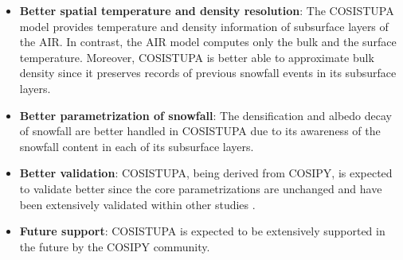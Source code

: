 \begin{itemize}

	\item \textbf{Better spatial temperature and density resolution}: The COSISTUPA model provides temperature and density
	      information of subsurface layers of the \ac{AIR}. In contrast, the \ac{AIR} model computes only the bulk and the
	      surface temperature. Moreover, COSISTUPA is better able to approximate bulk density since it preserves records of
	      previous snowfall events in its subsurface layers.

	\item \textbf{Better parametrization of snowfall}: The densification and albedo decay of snowfall are better
	      handled in COSISTUPA due to its awareness of the snowfall content in each of its subsurface layers.

	\item \textbf{Better validation}: COSISTUPA, being derived from COSIPY, is expected to validate better
	      since the core parametrizations are unchanged and have been extensively validated within other studies \citep{arndtAtmosphereDrivenMassBalance2021}.

	\item \textbf{Future support}: COSISTUPA is expected to be extensively supported in the future by the COSIPY
	      community.

\end{itemize}


